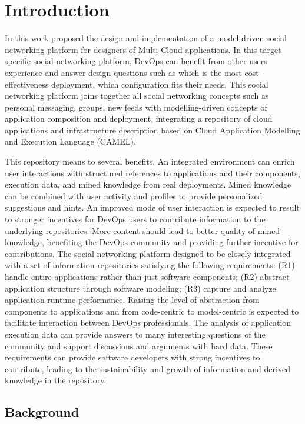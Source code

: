 \chapter{Introduction}
In this work proposed the design and implementation of a model-driven social networking platform for designers of Multi-Cloud applications. In this target specific social networking platform, DevOps can benefit from other users experience and answer design questions such as which is the most cost-effectiveness deployment, which configuration fits their needs. This social networking platform joins together all social networking concepts such as personal messaging, groups, new feeds with modelling-driven concepts of application composition and deployment, integrating a repository of cloud applications and infrastructure description based on Cloud Application Modelling and Execution Language (CAMEL). 

This repository means to several benefits, 
An integrated environment can enrich user interactions with structured references to applications and their components, execution data, and mined knowledge from real deployments. Mined knowledge can be combined with user activity and profiles to provide personalized suggestions and hints.  An improved mode of user interaction is expected to result to stronger incentives for DevOps users to contribute information to the underlying repositories. More content should lead to better quality of mined knowledge, benefiting the DevOps community and providing further incentive for contributions.  The social networking platform designed to be closely integrated with a set of information repositories satisfying the following requirements: 
(R1) handle entire applications rather than just software components; (R2) abstract application structure through software modeling; (R3) capture and analyze application runtime performance. Raising the level of abstraction from components to applications and from code-centric to model-centric is expected to facilitate interaction between DevOps professionals. The analysis of application execution data can provide answers to many interesting questions of the community and
support discussions and arguments with hard data. 
These requirements can provide software developers with strong incentives to contribute, leading to the sustainability and growth of information and derived knowledge in the repository.


\section{Background}


